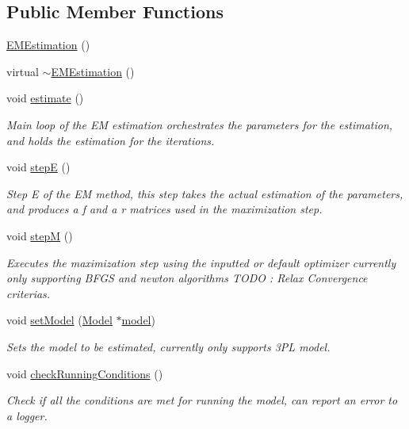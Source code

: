 \subsection*{Public Member Functions}
\begin{DoxyCompactItemize}
\item 
\hyperlink{classEMEstimation_a942acb2a0dcbd99dbd2669d6743e0e51}{E\+M\+Estimation} ()
\item 
virtual \hyperlink{classEMEstimation_a218c478d8b1b49c4ea9076ba30852c9d}{$\sim$\+E\+M\+Estimation} ()
\item 
void \hyperlink{classEMEstimation_a7391808764fd510d6a0f0351ec699b2d}{estimate} ()
\begin{DoxyCompactList}\small\item\em Main loop of the E\+M estimation orchestrates the parameters for the estimation, and holds the estimation for the iterations. \end{DoxyCompactList}\item 
void \hyperlink{classEMEstimation_afd00a80808f85581961d4d0ed2ce2a97}{step\+E} ()
\begin{DoxyCompactList}\small\item\em Step E of the E\+M method, this step takes the actual estimation of the parameters, and produces a f and a r matrices used in the maximization step. \end{DoxyCompactList}\item 
void \hyperlink{classEMEstimation_a8884e863f820e4a1a5caf099dca2ce1b}{step\+M} ()
\begin{DoxyCompactList}\small\item\em Executes the maximization step using the inputted or default optimizer currently only supporting B\+F\+G\+S and newton algorithms T\+O\+D\+O \+: Relax Convergence criterias. \end{DoxyCompactList}\item 
void \hyperlink{classEMEstimation_a6cd3ac7193ff9d5d92bd90b58da26e11}{set\+Model} (\hyperlink{classModel}{Model} $\ast$\hyperlink{classEMEstimation_ad7a5d7459c7c0632a1aa3917fd7f3ba0}{model})
\begin{DoxyCompactList}\small\item\em Sets the model to be estimated, currently only supports 3\+P\+L model. \end{DoxyCompactList}\item 
void \hyperlink{classEMEstimation_a482fdb64918b8e5d68e2f5091bef4b05}{check\+Running\+Conditions} ()
\begin{DoxyCompactList}\small\item\em Check if all the conditions are met for running the model, can report an error to a logger. \end{DoxyCompactList}\item 

\end{DoxyCompactItemize}
